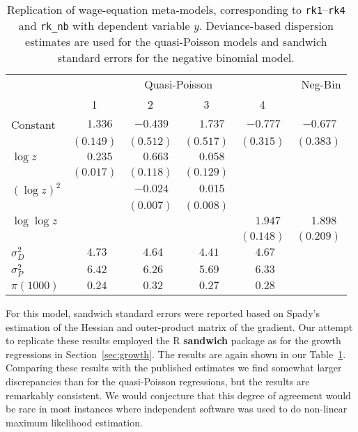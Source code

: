 \documentclass[10pt,a4paper,twoside]{article}
\let\code=\texttt
\let\pkg=\textbf
\let\proglang=\textsf
\begin{document}
\begin{table}[t]
\caption{\label{tab:rk}
  Replication of wage-equation meta-models, corresponding
  to \code{rk1}--\code{rk4} and \code{rk\_nb} with dependent variable $y$.  
  Deviance-based dispersion estimates are used for the quasi-Poisson models
  and sandwich standard errors for the negative binomial model.}
\begin{center}
\begin{tabular}{lrrrrr} \hline
& \multicolumn{4}{c}{Quasi-Poisson} & Neg-Bin \\
& \multicolumn{1}{c}{1} & \multicolumn{1}{c}{2} & \multicolumn{1}{c}{3}
& \multicolumn{1}{c}{4} & \\ \hline
Constant & $1.336\phantom{)}$ & $-0.439\phantom{)}$ & $1.737\phantom{)}$ & $-0.777\phantom{)}$ & $-0.677\phantom{)}$ \\
 & $(0.149)$ & $(0.512)$ & $(0.517)$ & $(0.315)$ & $(0.383)$ \\
$\log z$ & $0.235\phantom{)}$ & $0.663\phantom{)}$ & $0.058\phantom{)}$ &  &  \\
 & $(0.017)$ & $(0.118)$ & $(0.129)$ &  &  \\
$(\log z)^2$ &  & $-0.024\phantom{)}$ & $0.015\phantom{)}$ &  &  \\
 &  & $(0.007)$ & $(0.008)$ &  &  \\
$\log \log z$ &  &  &  & $1.947\phantom{)}$ & $1.898\phantom{)}$ \\
 &  &  &  & $(0.148)$ & $(0.209)$ \\ \hline
$\sigma^2_D$ & $4.73\phantom{0)}$ & $4.64\phantom{0)}$ & $4.41\phantom{0)}$ & $4.67\phantom{0)}$ & $\phantom{0)}$ \\
$\sigma^2_P$ & $6.42\phantom{0)}$ & $6.26\phantom{0)}$ & $5.69\phantom{0)}$ & $6.33\phantom{0)}$ & $\phantom{0)}$ \\
$\pi(1000)$ & $0.24\phantom{0)}$ & $0.32\phantom{0)}$ & $0.27\phantom{0)}$ & $0.28\phantom{0)}$ & $\phantom{0)}$ \\ \hline\end{tabular}
\end{center}
\end{table}
%
For this model, sandwich standard errors were reported based on Spady's 
estimation of the Hessian and outer-product matrix of the gradient.  Our
attempt to replicate these results  employed the \proglang{R} \pkg{sandwich}
package as for the growth regressions in Section~\ref{sec:growth}.
The results are again shown in our Table~\ref{tab:rk}. 
Comparing these results with the published estimates we find somewhat larger 
discrepancies than for the quasi-Poisson regressions, but the results are
remarkably consistent.  We would conjecture that this degree of agreement 
would be rare in most instances where independent software was used to do
non-linear maximum likelihood estimation.
\end{document}
